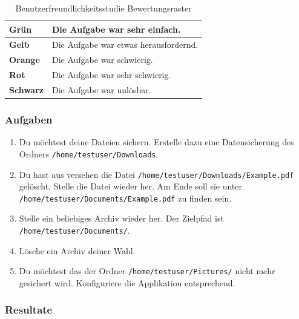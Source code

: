 \begin{table}[H]
\centering
\begin{tabular}{|l|l|}
\hline
\textbf{Grün}\cellcolor[HTML]{4CAF50} & Die Aufgabe war sehr einfach.\\
\hline
\textbf{Gelb}\cellcolor[HTML]{FFEB3B} & Die Aufgabe war etwas herausfordernd.\\
\hline
\textbf{Orange}\cellcolor[HTML]{FF9800} & Die Aufgabe war schwierig.\\
\hline
\textbf{Rot}\cellcolor[HTML]{f44336} & Die Aufgabe war sehr schwierig.\\
\hline
\textbf{Schwarz}\cellcolor[HTML]{424242} & Die Aufgabe war unlösbar.\\
\hline
\end{tabular}
\caption{\label{tab:org0009551}
Benutzerfreundlichkeitsstudie Bewertungsraster}

\end{table}

\subsubsection{Aufgaben}
\label{sec:org7336e25}

\begin{enumerate}
\item Du möchtest deine Dateien sichern. Erstelle dazu eine Datensicherung des Ordners \texttt{/home/testuser/Downloads}.
\item Du hast aus versehen die Datei \texttt{/home/testuser/Downloads/Example.pdf}
gelöscht. Stelle die Datei wieder her. Am Ende soll sie unter
\texttt{/home/testuser/Documents/Example.pdf} zu finden sein.
\item Stelle ein beliebiges Archiv wieder her. Der Zielpfad ist \texttt{/home/testuser/Documents/}.
\item Lösche ein Archiv deiner Wahl.
\item Du möchtest das der Ordner \texttt{/home/testuser/Pictures/} nicht mehr gesichert
wird. Konfiguriere die Applikation entsprechend.
\end{enumerate}

\subsubsection{Resultate}
\label{sec:org4179596}

